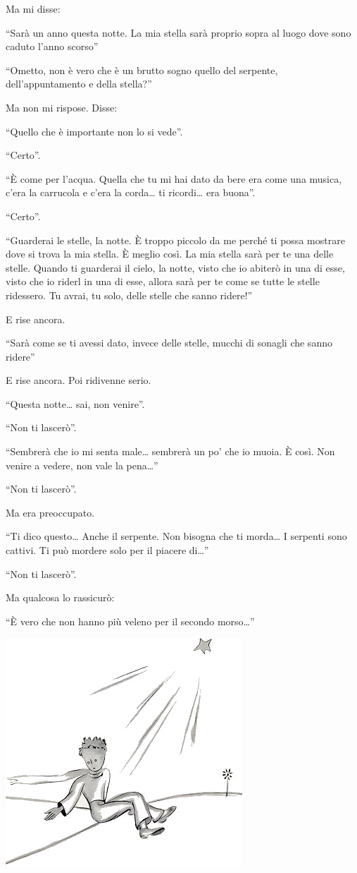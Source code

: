 \documentclass[11pt]{scrbook}
\begin{document}
Ma mi disse:

``Sarà un anno questa notte. La mia stella sarà proprio sopra al luogo dove sono caduto l'anno scorso''

``Ometto, non è vero che è un brutto sogno quello del serpente, dell'appuntamento e della stella?''

Ma non mi rispose. Disse:

``Quello che è importante non lo si vede''.

``Certo''.

``È come per l'acqua. Quella che tu mi hai dato da bere era come una musica, c'era la carrucola e c'era la corda\ldots{} ti ricordi\ldots{} era buona''.

``Certo''.

``Guarderai le stelle, la notte. È troppo piccolo da me perché ti possa mostrare dove si trova la mia stella. È meglio così. La mia stella sarà per te una delle stelle. Quando ti guarderai il cielo, la notte, visto che io abiterò in una di esse, visto che io riderl in una di esse, allora sarà per te come se tutte le stelle ridessero. Tu avrai, tu solo, delle stelle che sanno ridere!''

E rise ancora.

``Sarà come se ti avessi dato, invece delle stelle, mucchi di sonagli che sanno ridere''

E rise ancora. Poi ridivenne serio.

``Questa notte\ldots{} sai, non venire''.

``Non ti lascerò''.

``Sembrerà che io mi senta male\ldots{} sembrerà un po' che io muoia. È così. Non venire a vedere, non vale la pena\ldots{}''

``Non ti lascerò''.

Ma era preoccupato.

``Ti dico questo\ldots{} Anche il serpente. Non bisogna che ti morda\ldots{} I serpenti sono cattivi. Ti può mordere solo per il piacere di\ldots{}''

``Non ti lascerò''.

Ma qualcosa lo rassicurò:

``È vero che non hanno più veleno per il secondo morso\ldots{}''

\begin{center}
\includegraphics{img/26b}
\end{center}
\end{document}
